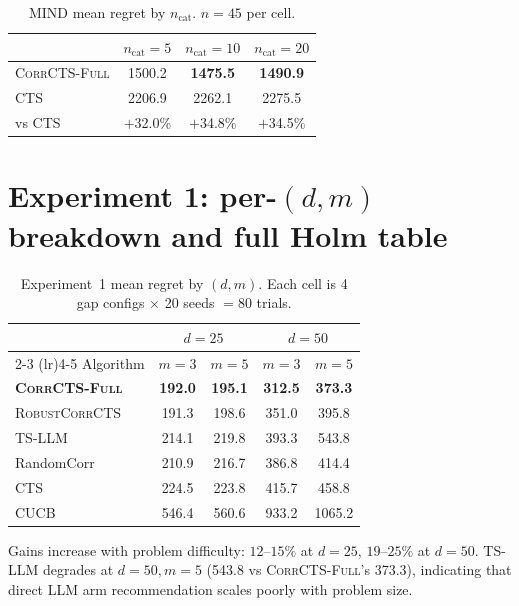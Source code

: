 \documentclass{article}
\theoremstyle{plain}
\theoremstyle{definition}
\theoremstyle{remark}
\newcommand{\CorrFull}{\textsc{CorrCTS-Full}}
\newcommand{\RobustCorr}{\textsc{RobustCorrCTS}}
\begin{document}
\begin{table}[h]
\caption{MIND mean regret by $n_\text{cat}$. $n = 45$ per cell.}
\label{tab:mind-cats}
\centering
\small
\begin{tabular}{@{}lccc@{}}
\toprule
 & $n_\text{cat}{=}5$ & $n_\text{cat}{=}10$ & $n_\text{cat}{=}20$ \\
\midrule
\CorrFull{} & 1500.2 & \textbf{1475.5} & \textbf{1490.9} \\
CTS & 2206.9 & 2262.1 & 2275.5 \\
\midrule
vs CTS & $+$32.0\% & $+$34.8\% & $+$34.5\% \\
\bottomrule
\end{tabular}
\end{table}

\section{Experiment 1: per-$(d,m)$ breakdown and full Holm table}\label{app:perdm}

\begin{table}[h]
\caption{Experiment~1 mean regret by $(d, m)$. Each cell is 4 gap configs $\times$ 20 seeds $= 80$ trials.}
\label{tab:perdm}
\centering
\small
\begin{tabular}{@{}lcccc@{}}
\toprule
 & \multicolumn{2}{c}{$d=25$} & \multicolumn{2}{c}{$d=50$} \\
\cmidrule(lr){2-3} \cmidrule(lr){4-5}
Algorithm & $m{=}3$ & $m{=}5$ & $m{=}3$ & $m{=}5$ \\
\midrule
\textbf{\CorrFull{}} & \textbf{192.0} & \textbf{195.1} & \textbf{312.5} & \textbf{373.3} \\
\RobustCorr{} & 191.3 & 198.6 & 351.0 & 395.8 \\
TS-LLM & 214.1 & 219.8 & 393.3 & 543.8 \\
RandomCorr & 210.9 & 216.7 & 386.8 & 414.4 \\
CTS & 224.5 & 223.8 & 415.7 & 458.8 \\
CUCB & 546.4 & 560.6 & 933.2 & 1065.2 \\
\bottomrule
\end{tabular}
\end{table}

Gains increase with problem difficulty: $12$--$15\%$ at $d = 25$, $19$--$25\%$ at $d = 50$.
TS-LLM degrades at $d = 50, m = 5$ (543.8 vs \CorrFull{}'s 373.3), indicating that direct LLM arm recommendation scales poorly with problem size.
\end{document}
